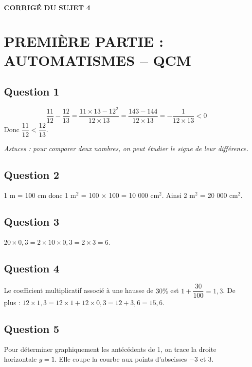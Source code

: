 \documentclass[a4paper,12pt]{article}
\begin{document}
\begin{center}\Large\textbf{CORRIGÉ DU SUJET 4}\end{center}

\section*{PREMIÈRE PARTIE : AUTOMATISMES -- QCM}

\subsection*{Question 1}
\[
\frac{11}{12} - \frac{12}{13} = \frac{11 \times 13 - 12^2}{12 \times 13} = \frac{143 - 144}{12 \times 13} = -\frac{1}{12 \times 13} < 0
\]
Donc $\dfrac{11}{12} < \dfrac{12}{13}$.


\emph{Astuces : pour comparer deux nombres, on peut étudier le signe de leur différence.}

\subsection*{Question 2}
1 m = 100 cm donc 1 m$^2$ = 100 $\times$ 100 = 10 000 cm$^2$.
Ainsi 2 m$^2$ = 20 000 cm$^2$.


\subsection*{Question 3}
$20 \times 0,3 = 2 \times 10 \times 0,3 = 2 \times 3 = 6$.


\subsection*{Question 4}
Le coefficient multiplicatif associé à une hausse de $30\%$ est $1 + \dfrac{30}{100} = 1,3$.
De plus : $12 \times 1,3 = 12 \times 1 + 12 \times 0,3 = 12 + 3,6 = 15,6$.


\subsection*{Question 5}
Pour déterminer graphiquement les antécédents de 1, on trace la droite horizontale $y = 1$. Elle coupe la courbe aux points d'abscisses $-3$ et $3$.
\end{document}
